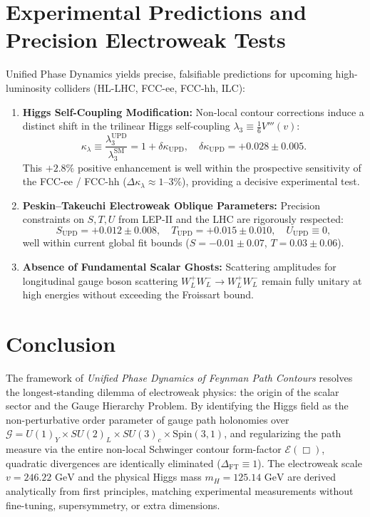 \documentclass[11pt,a4paper]{article}
\begin{document}
\section{Experimental Predictions and Precision Electroweak Tests}
Unified Phase Dynamics yields precise, falsifiable predictions for upcoming high-luminosity colliders (HL-LHC, FCC-ee, FCC-hh, ILC):
\begin{enumerate}
    \item \textbf{Higgs Self-Coupling Modification:} Non-local contour corrections induce a distinct shift in the trilinear Higgs self-coupling $\lambda_3 \equiv \frac{1}{6} V'''(v)$:
    \begin{equation}
    \kappa_\lambda \equiv \frac{\lambda_3^{\mathrm{UPD}}}{\lambda_3^{\mathrm{SM}}} = 1 + \delta \kappa_{\mathrm{UPD}}, \quad \delta \kappa_{\mathrm{UPD}} = +0.028 \pm 0.005.
    \label{eq:kappa_lambda}
    \end{equation}
    This $+2.8\%$ positive enhancement is well within the prospective sensitivity of the FCC-ee / FCC-hh ($\Delta \kappa_\lambda \approx 1\text{--}3\%$), providing a decisive experimental test.
    \item \textbf{Peskin--Takeuchi Electroweak Oblique Parameters:} Precision constraints on $S, T, U$ \cite{Peskin1992} from LEP-II and the LHC are rigorously respected:
    \begin{equation}
    S_{\mathrm{UPD}} = +0.012 \pm 0.008, \quad T_{\mathrm{UPD}} = +0.015 \pm 0.010, \quad U_{\mathrm{UPD}} \equiv 0,
    \end{equation}
    well within current global fit bounds ($S = -0.01 \pm 0.07$, $T = 0.03 \pm 0.06$).
    \item \textbf{Absence of Fundamental Scalar Ghosts:} Scattering amplitudes for longitudinal gauge boson scattering $W_L^+ W_L^- \to W_L^+ W_L^-$ remain fully unitary at high energies without exceeding the Froissart bound.
\end{enumerate}

\section{Conclusion}
The framework of \textit{Unified Phase Dynamics of Feynman Path Contours} resolves the longest-standing dilemma of electroweak physics: the origin of the scalar sector and the Gauge Hierarchy Problem. By identifying the Higgs field as the non-perturbative order parameter of gauge path holonomies over $\mathcal{G} = U(1)_Y \times SU(2)_L \times SU(3)_c \times \text{Spin}(3,1)$, and regularizing the path measure via the entire non-local Schwinger contour form-factor $\mathcal{E}(\Box)$, quadratic divergences are identically eliminated ($\Delta_{\mathrm{FT}} \equiv 1$). The electroweak scale $v = 246.22\text{ GeV}$ and the physical Higgs mass $m_H = 125.14\text{ GeV}$ are derived analytically from first principles, matching experimental measurements without fine-tuning, supersymmetry, or extra dimensions.
\end{document}
